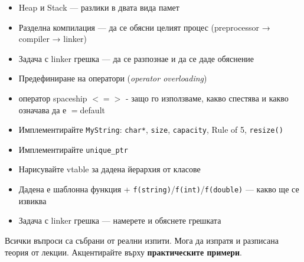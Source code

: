 \documentclass[a4paper,11pt]{article}
\newcommand{\qtag}[1]{\texttt{\color{greenaccent}\small#1}}
\begin{document}
\begin{tcolorbox}[categorybox, title={13.\ Памет, компилация и свързване}]
\begin{itemize}
  \item Heap и Stack — разлики в двата вида памет
  \item Разделна компилация — да се обясни целият процес (preprocessor → compiler → linker)
  \item Задача с linker грешка — да се разпознае и да се даде обяснение
  \item Предефиниране на оператори (\textit{operator overloading})
  \item оператор spaceship \qtag{$<=>$} - защо го използваме, какво спестява и какво означава да е $=$default
\end{itemize}
\end{tcolorbox}

\begin{tcolorbox}[categorybox, title={14.\ Практически задачи}]
\begin{itemize}
  \item Имплементирайте \qtag{MyString}: \qtag{char*}, \qtag{size}, \qtag{capacity}, Rule of 5, \qtag{resize()}
  \item Имплементирайте \qtag{unique\_ptr}
  \item Нарисувайте vtable за дадена йерархия от класове
  \item Дадена е шаблонна функция + \qtag{f(string)}/\qtag{f(int)}/\qtag{f(double)} — какво ще се извиква
  \item Задача с linker грешка — намерете и обяснете грешката
\end{itemize}
\end{tcolorbox}

\vfill
\begin{center}
  \color{subtitle}\small
  \faInfoCircle\quad Всички въпроси са събрани от реални изпити. Мога да изпратя и разписана теория от лекции. Акцентирайте върху \textbf{практическите примери}.
\end{center}
\end{document}
